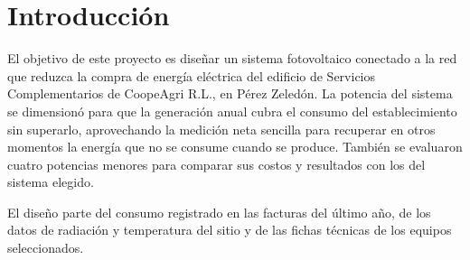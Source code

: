 \section{Introducción}

El objetivo de este proyecto es diseñar un sistema fotovoltaico conectado a la red que reduzca la compra de energía eléctrica del edificio de Servicios Complementarios de CoopeAgri R.L., en Pérez Zeledón. La potencia del sistema se dimensionó para que la generación anual cubra el consumo del establecimiento sin superarlo, aprovechando la medición neta sencilla para recuperar en otros momentos la energía que no se consume cuando se produce. También se evaluaron cuatro potencias menores para comparar sus costos y resultados con los del sistema elegido.

El diseño parte del consumo registrado en las facturas del último año, de los datos de radiación y temperatura del sitio y de las fichas técnicas de los equipos seleccionados.

